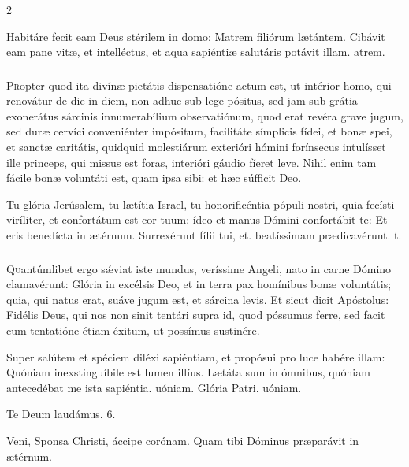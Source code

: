 \documentclass[9pt,twoside]{extarticle}
\begin{document}
\begin{multicols}{2}
\begin{tightlist}{}
\item {} Habitáre fecit eam Deus stérilem in domo: \textred{*} Matrem filiórum lætántem.  Cibávit eam pane vitæ, et intelléctus, et aqua sapiéntiæ salutáris potávit illam. atrem.
\end{tightlist}

\subsubsection*{\center {}}
\lettrine{P}ropter quod ita divínæ pietátis dispensatióne actum est, ut intérior homo, qui renovátur de die in diem, non adhuc sub lege pósitus, sed jam sub grátia exonerátus sárcinis innumerabílium observatiónum, quod erat revéra grave jugum, sed duræ cervíci conveniénter impósitum, facilitáte símplicis fídei, et bonæ spei, et sanctæ caritátis, quidquid molestiárum exterióri hómini forínsecus intulísset ille princeps, qui missus est foras, interióri gáudio fíeret leve. Nihil enim tam fácile bonæ voluntáti est, quam ipsa sibi: et hæc súfficit Deo.

\begin{tightlist}{}
\item {} Tu glória Jerúsalem, tu lætítia Israel, tu honorificéntia pópuli nostri, quia fecísti viríliter, et confortátum est cor tuum: ídeo et manus Dómini confortábit te: \textred{*} Et eris benedícta in ætérnum.  Surrexérunt fílii tui, et. beatíssimam prædicavérunt. t.
\end{tightlist}

\subsubsection*{\center {}}
\lettrine{Q}uantúmlibet ergo sǽviat iste mundus, veríssime Angeli, nato in carne Dómino clamavérunt: Glória in excélsis Deo, et in terra pax homínibus bonæ voluntátis; quia, qui natus erat, suáve jugum est, et sárcina levis. Et sicut dicit Apóstolus: Fidélis Deus, qui nos non sinit tentári supra id, quod póssumus ferre, sed facit cum tentatióne étiam éxitum, ut possímus sustinére.

\begin{tightlist}{}
\item {} Super salútem et spéciem diléxi sapiéntiam, et propósui pro luce habére illam: \textred{*} Quóniam inexstinguíbile est lumen illíus.  Lætáta sum in ómnibus, quóniam antecedébat me ista sapiéntia. uóniam. Glória Patri. uóniam.
\item Te Deum laudámus. 6.
\item {} Veni, Sponsa Christi, áccipe corónam.  Quam tibi Dóminus præparávit in ætérnum.
\end{tightlist}


\end{multicols}
\end{document}
